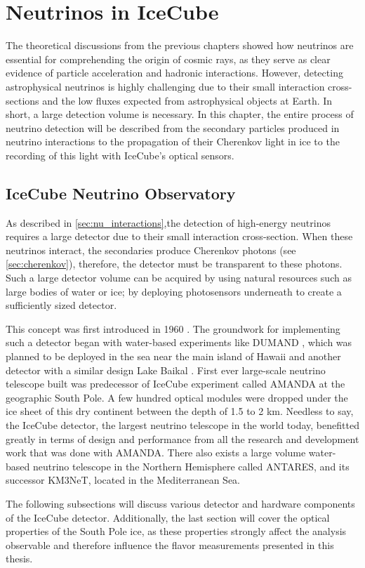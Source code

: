 \setchapterpreamble[u]{\margintoc}
\chapter{Neutrinos in IceCube} 



The theoretical discussions from the previous chapters showed how neutrinos are essential for comprehending the origin of cosmic rays, as they serve as clear evidence of particle acceleration and hadronic interactions. However, detecting astrophysical neutrinos is highly challenging due to their small interaction cross-sections and the low fluxes expected from astrophysical objects at Earth. In short, a large detection volume is necessary. In this chapter, the entire process of neutrino detection will be described from the secondary particles produced in neutrino interactions to the propagation of their Cherenkov light in ice to the recording of this light with IceCube’s optical sensors.


\section{IceCube Neutrino Observatory}
\label{sec:IC_detector}
As described in \ref{sec:nu_interactions},the detection of high-energy neutrinos requires a large detector due to their small interaction cross-section. When these neutrinos interact, the secondaries produce Cherenkov photons (see \ref{sec:cherenkov}), therefore, the detector must be transparent to these photons. Such a large detector volume can be acquired by using natural resources such as large bodies of water or ice; by deploying photosensors underneath to create a sufficiently sized detector.\par
This concept was first introduced in 1960 . The groundwork for implementing such a detector began with water-based experiments like DUMAND , which was planned to be deployed in the sea near the main island of Hawaii and another detector with a similar design Lake Baikal . First ever large-scale neutrino telescope built was predecessor of IceCube experiment called AMANDA  at the geographic South Pole. A few hundred optical modules were dropped under the ice sheet of this dry continent between the depth of 1.5 to 2 km. Needless to say, the IceCube detector, the largest neutrino telescope in the world today, benefitted greatly in terms of design and performance from all the research and development work that was done with AMANDA. 
There also exists a large volume water-based neutrino telescope in the Northern Hemisphere called ANTARES, and its successor KM3NeT, located in the Mediterranean Sea.\par
The following subsections will discuss various detector and hardware components of the IceCube detector. Additionally, the last section will cover the optical properties of the South Pole ice, as these properties strongly affect the analysis observable and therefore influence the flavor measurements presented in this thesis.\par


